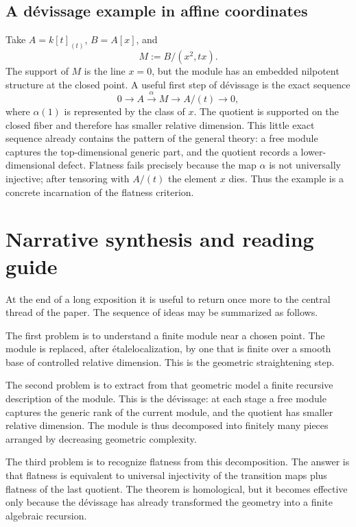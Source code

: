 \documentclass[11pt,oneside]{article}
\newcommand{\etale}{\'etale}
\begin{document}
\subsection{A d\'evissage example in affine coordinates}

Take $A=k[t]_{(t)}$, $B=A[x]$, and
\[
M:=B/(x^2,tx).
\]
The support of $M$ is the line $x=0$, but the module has an embedded nilpotent structure at the closed point.  A useful first step of d\'evissage is the exact sequence
\[
0\to A\xrightarrow{\alpha} M\to A/(t)\to 0,
\]
where $\alpha(1)$ is represented by the class of $x$.  The quotient is supported on the closed fiber and therefore has smaller relative dimension.  This little exact sequence already contains the pattern of the general theory: a free module captures the top-dimensional generic part, and the quotient records a lower-dimensional defect.  Flatness fails precisely because the map $\alpha$ is not universally injective; after tensoring with $A/(t)$ the element $x$ dies.  Thus the example is a concrete incarnation of the flatness criterion.

\section{Narrative synthesis and reading guide}

At the end of a long exposition it is useful to return once more to the central thread of the paper.  The sequence of ideas may be summarized as follows.

The first problem is to understand a finite module near a chosen point.  The module is replaced, after \etale localization, by one that is finite over a smooth base of controlled relative dimension.  This is the geometric straightening step.

The second problem is to extract from that geometric model a finite recursive description of the module.  This is the d\'evissage: at each stage a free module captures the generic rank of the current module, and the quotient has smaller relative dimension.  The module is thus decomposed into finitely many pieces arranged by decreasing geometric complexity.

The third problem is to recognize flatness from this decomposition.  The answer is that flatness is equivalent to universal injectivity of the transition maps plus flatness of the last quotient.  The theorem is homological, but it becomes effective only because the d\'evissage has already transformed the geometry into a finite algebraic recursion.
\end{document}
